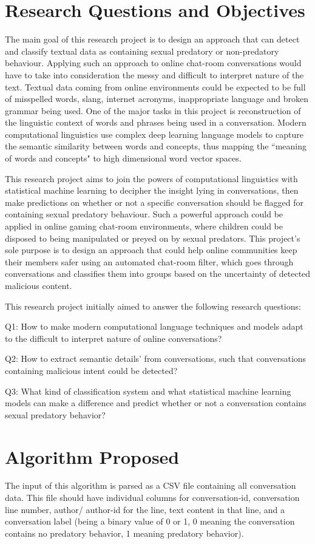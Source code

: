 \documentclass[11pt]{article}
\begin{document}
\section{Research Questions and Objectives}
\indent The main goal of this research project is to design an approach that can detect and classify textual data as containing sexual predatory or non-predatory behaviour. Applying such an approach to online chat-room conversations would have to take into consideration the messy and difficult to interpret nature of the text. Textual data coming from online environments could be expected to be full of misspelled words, slang, internet acronyms, inappropriate language and broken grammar being used. One of the major tasks in this project is reconstruction of the linguistic context of words and phrases being used in a conversation. Modern computational linguistics use complex deep learning language models to capture the semantic similarity between words and concepts, thus mapping the ``meaning of words and concepts" to high dimensional word vector spaces. 

\indent This research project aims to join the powers of computational linguistics with statistical machine learning to decipher the insight lying in conversations, then make predictions on whether or not a specific conversation should be flagged for containing sexual predatory behaviour. Such a powerful approach could be applied in online gaming chat-room environments, where children could be disposed to being manipulated or preyed on by sexual predators. This project's sole purpose is to design an approach that could help online communities keep their members safer using an automated chat-room filter, which goes through conversations and classifies them into groups based on the uncertainty of detected malicious content.

\indent This research project initially aimed to answer the following research questions:

Q1: How to make modern computational language techniques and models adapt to the difficult to interpret nature of online conversations?

Q2: How to extract semantic details' from conversations, such that conversations containing malicious intent could be detected?

Q3: What kind of classification system and what statistical machine learning models can make a difference and predict whether or not a conversation contains sexual predatory behavior?

\section{Algorithm Proposed}
The input of this algorithm is parsed as a CSV file containing all conversation data. This file should have individual columns for conversation-id, conversation line number, author/ author-id for the line, text content in that line, and a conversation label (being a binary value of 0 or 1, 0 meaning the conversation contains no predatory behavior, 1 meaning predatory behavior).
\end{document}
